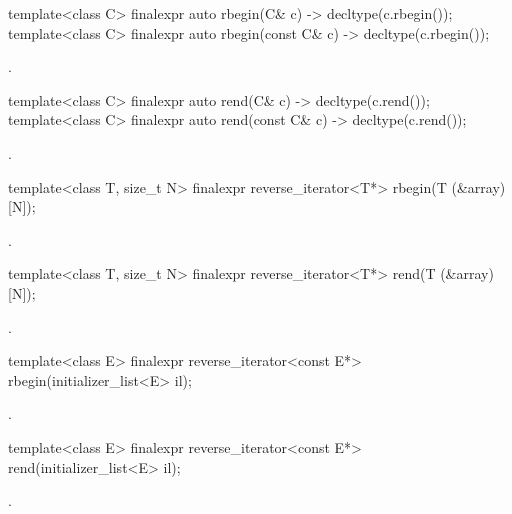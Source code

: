 %
\begin{itemdecl}
template<class C> finalexpr auto rbegin(C& c) -> decltype(c.rbegin());
template<class C> finalexpr auto rbegin(const C& c) -> decltype(c.rbegin());
\end{itemdecl}
\begin{itemdescr}
\pnum \returns {}.
\end{itemdescr}

%
\begin{itemdecl}
template<class C> finalexpr auto rend(C& c) -> decltype(c.rend());
template<class C> finalexpr auto rend(const C& c) -> decltype(c.rend());
\end{itemdecl}
\begin{itemdescr}
\pnum \returns {}.
\end{itemdescr}

%
\begin{itemdecl}
template<class T, size_t N> finalexpr reverse_iterator<T*> rbegin(T (&array)[N]);
\end{itemdecl}
\begin{itemdescr}
\pnum \returns {}.
\end{itemdescr}

%
\begin{itemdecl}
template<class T, size_t N> finalexpr reverse_iterator<T*> rend(T (&array)[N]);
\end{itemdecl}
\begin{itemdescr}
\pnum \returns {}.
\end{itemdescr}

%
\begin{itemdecl}
template<class E> finalexpr reverse_iterator<const E*> rbegin(initializer_list<E> il);
\end{itemdecl}
\begin{itemdescr}
\pnum \returns {}.
\end{itemdescr}

%
\begin{itemdecl}
template<class E> finalexpr reverse_iterator<const E*> rend(initializer_list<E> il);
\end{itemdecl}
\begin{itemdescr}
\pnum \returns {}.
\end{itemdescr}

